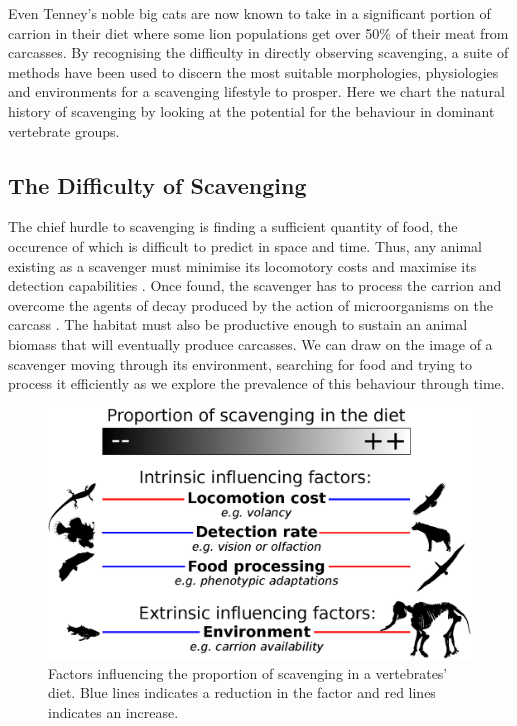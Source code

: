 \documentclass[a4paper,12pt]{article}
\begin{document}
Even Tenney’s noble big cats are now known to take in a significant portion of carrion in their diet where some lion populations get over 50\% of their meat from carcasses.
By recognising the difficulty in directly observing scavenging, a suite of methods have been used to discern the most suitable morphologies, physiologies and environments for a scavenging lifestyle to prosper.
Here we chart the natural history of scavenging by looking at the potential for the behaviour in dominant vertebrate groups.

\subsection*{The Difficulty of Scavenging} %
The chief hurdle to scavenging is finding a sufficient quantity of food, the occurence of which is difficult to predict in space and time. Thus, any animal existing as a scavenger must minimise its locomotory costs and maximise its detection capabilities \citep{ruxton2004obligate}.
Once found, the scavenger has to process the carrion and overcome the agents of decay produced by the action of microorganisms on the carcass \citep{ruxton2014fruit}. 
The habitat must also be productive enough to sustain an animal biomass that will eventually produce carcasses.
We can draw on the image of a scavenger moving through its environment, searching for food and trying to process it efficiently as we explore the prevalence of this behaviour through time. 

\begin{figure}[!htbp]
\centering
   \includegraphics[width=1\textwidth]{Summary_figure/Summary_figure.eps}
\caption{Factors influencing the proportion of scavenging in a vertebrates' diet. Blue lines indicates a reduction in the factor and red lines indicates an increase.}
\label{Summary_figure}
\end{figure}
\end{document}
